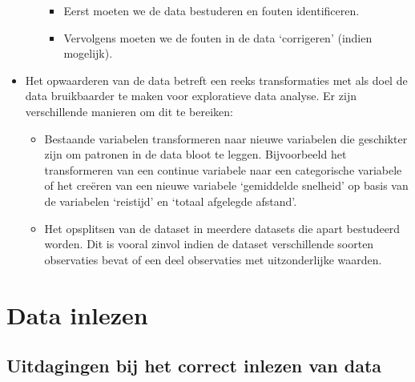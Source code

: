 \documentclass[]{memoir}
\providecommand{\tightlist}{%
  \setlength{\itemsep}{0pt}\setlength{\parskip}{0pt}}
\begin{document}
\begin{itemize}
\begin{itemize}
    \begin{itemize}
    \tightlist
    \item
      Eerst moeten we de data bestuderen en fouten identificeren.
    \item
      Vervolgens moeten we de fouten in de data `corrigeren' (indien mogelijk).
    \end{itemize}
  \end{itemize}
\item
  Het opwaarderen van de data betreft een reeks transformaties met als doel de data bruikbaarder te maken voor exploratieve data analyse. Er zijn verschillende manieren om dit te bereiken:

  \begin{itemize}
  \tightlist
  \item
    Bestaande variabelen transformeren naar nieuwe variabelen die geschikter zijn om patronen in de data bloot te leggen. Bijvoorbeeld het transformeren van een continue variabele naar een categorische variabele of het creëren van een nieuwe variabele `gemiddelde snelheid' op basis van de variabelen `reistijd' en `totaal afgelegde afstand'.
  \item
    Het opsplitsen van de dataset in meerdere datasets die apart bestudeerd worden. Dit is vooral zinvol indien de dataset verschillende soorten observaties bevat of een deel observaties met uitzonderlijke waarden.
  \end{itemize}
\end{itemize}

\hypertarget{data-inlezen}{%
\section{Data inlezen}\label{data-inlezen}}

\hypertarget{uitdagingen-bij-het-correct-inlezen-van-data}{%
\subsection{Uitdagingen bij het correct inlezen van data}\label{uitdagingen-bij-het-correct-inlezen-van-data}}
\end{document}
